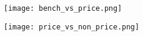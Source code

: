 \documentclass{beamer}
\begin{document}
\begin{frame}[plain]
	\begin{figure}
	\texttt{[image: bench\_vs\_price.png]}
	\end{figure}
\end{frame}

\begin{frame}[plain]
	\begin{figure}
	\texttt{[image: price\_vs\_non\_price.png]}
	\end{figure}
\end{frame}


\end{document}
